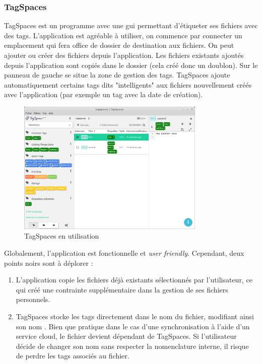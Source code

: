 \documentclass[a4paper, 12pt]{article}
\begin{document}
\subsubsection{TagSpaces}
TagSpaces \cite{ref13} est un programme avec une \acrshort{gui} permettant d'étiqueter ses fichiers avec des tags. 
L'application est agréable à utiliser, on commence par connecter un emplacement qui fera office de dossier de 
destination aux fichiers. On peut ajouter ou créer des fichiers depuis l'application. Les fichiers 
existants ajoutés depuis l'application sont copiés dans le dossier (cela créé donc un doublon). 
Sur le panneau de gauche se situe la zone de gestion des tags. TagSpaces ajoute automatiquement 
certains tags dits "intelligents" aux fichiers nouvellement créés avec l'application (par exemple 
un tag avec la date de création).
\begin{figure}
    \begin{center}
        \includegraphics[width=0.8\textwidth]{images/tagspaces.png}
    \end{center}
    \caption{TagSpaces en utilisation}
    \label{tagspaces}
\end{figure}
Globalement, l'application est fonctionnelle et \textit{user friendly}. Cependant, deux points noirs 
sont à déplorer :
\begin{enumerate}
    \item L'application copie les fichiers déjà existants sélectionnés par l'utilisateur, ce qui 
        créé une contrainte supplémentaire dans la gestion de ses fichiers personnels.
    \item TagSpaces stocke les tags directement dans le nom du fichier, modifiant ainsi son nom \cite{ref14}.
        Bien que pratique dans le cas d'une synchronisation à l'aide d'un service cloud, 
        le fichier devient dépendant de TagSpaces. Si l'utilisateur décide de changer son nom sans 
        respecter la nomenclature interne, il risque de perdre les tags associés au fichier.
\end{enumerate}
\end{document}
